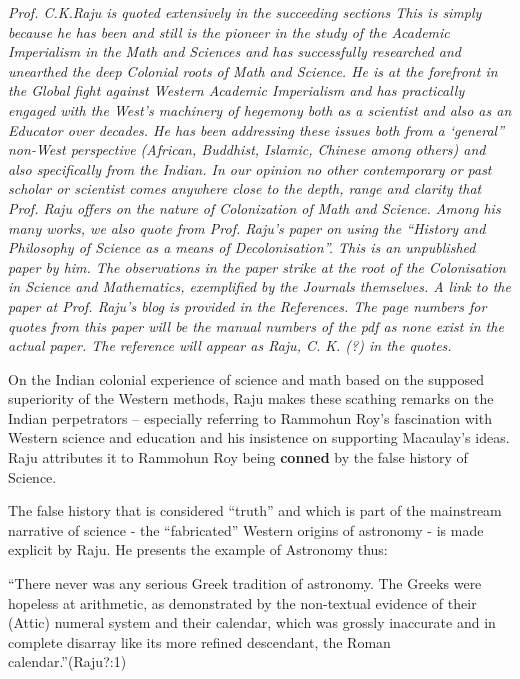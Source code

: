 \textit{Prof. C.K.Raju is quoted extensively in the succeeding sections This is simply because he has been and still is the pioneer in the study of the Academic Imperialism in the Math and Sciences and has successfully researched and unearthed the deep Colonial roots of Math and Science. He is at the forefront in the Global fight against Western Academic Imperialism and has practically engaged with the West’s machinery of hegemony both as a scientist and also as an Educator over decades. He has been addressing these issues both from a ‘general” non-West perspective (African, Buddhist, Islamic, Chinese among others) and also specifically from the Indian. In our opinion no other contemporary or past scholar or scientist comes anywhere close to the depth, range and clarity that Prof. Raju offers on the nature of Colonization of Math and Science. Among his many works, we also quote from Prof. Raju’s paper on using the “History and Philosophy of Science as a means of Decolonisation”. This is an unpublished paper by him. The observations in the paper strike at the root of the Colonisation in Science and Mathematics, exemplified by the Journals themselves. A link to the paper at Prof. Raju’s blog is provided in the References. The page numbers for quotes from this paper will be the manual numbers of the pdf as none exist in the actual paper. The reference will appear as Raju, C. K. (?) in the quotes.}

\vskip 3pt

On the Indian colonial experience of science and math based on the supposed superiority of the Western methods, Raju makes these scathing remarks on the Indian perpetrators – especially referring to Rammohun Roy’s fascination with Western science and education and his insistence on supporting Macaulay’s ideas. Raju attributes it to Rammohun Roy being \textbf{conned} by the false history of Science.

The false history that is considered “truth” and which is part of the mainstream narrative of science - the “fabricated” Western origins of astronomy - is made explicit by Raju. He presents the example of Astronomy thus:

\begin{myquote}
“There never was any serious Greek tradition of astronomy. The Greeks were hopeless at arithmetic, as demonstrated by the non-textual evidence of their (Attic) numeral system and their calendar, which was grossly inaccurate and in complete disarray like its more refined descendant, the Roman calendar.”\hfill (Raju?:1)
\end{myquote}

